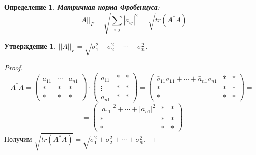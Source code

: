 \documentclass[12pt]{article}
\newtheorem*{definition}{Определение}
\newtheorem*{statement}{Утверждение}
\begin{document}
	\begin{definition}
		\textbf{Матричная норма Фробениуса}:
		$$||A||_F=\sqrt{\sum\limits_{i,j}|a_{ij}|^2}=\sqrt{tr(A^*A)}$$
	\end{definition}
	\begin{statement}
		$||A||_F = \sqrt{\sigma_1^2+\sigma_2^2+\cdots+\sigma_n^2}$.
	\end{statement}
	\begin{proof}
		\[A^*A=\begin{pmatrix}
		\bar a_{11} & \cdots & \bar a_{n1}\\
		* & * & *\\
		* & * & *
		\end{pmatrix} \cdot \begin{pmatrix}
		a_{11} & * & *\\
		\vdots & * & *\\
		a_{n1} & * & *
		\end{pmatrix} = \begin{pmatrix}
		\bar a_{11} a_{11}+\cdots+\bar a_{n1} a_{n1} & * & *\\
		* & * & *\\
		* & * & *
		\end{pmatrix}=\] \[=\begin{pmatrix}
		|a_{11}|^2+\cdots +|a_{n1}|^2 & * & *\\
		* & * & *\\
		* & * & *
		\end{pmatrix}\]
		Получим $\sqrt{tr(A^*A)}=\sqrt{\sigma_1^2+\sigma_2^2+\cdots+\sigma_n^2}$.
	\end{proof}
	
\end{document}
